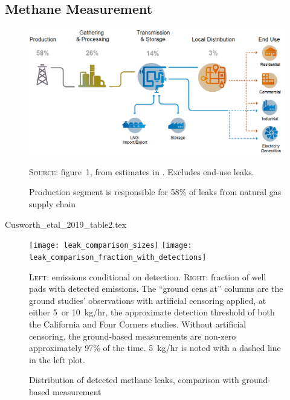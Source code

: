 \documentclass[12pt,oneside,letterpaper]{article}
\theoremstyle{definition}
\begin{document}
\begin{refsection}
\newpage
\section{Methane Measurement}
\label{app:methane-measurement}

\begin{figure}[!hbtp]
\caption{Production segment is responsible for 58\% of leaks from natural gas supply chain}
\vspace*{1\baselineskip}

\label{fig:EPA-leak-percentages-Marks}

\includegraphics[width=\textwidth]{natural_gas_leakage_percentages_marks_fig1}

\textsc{Source:} \textcite{Marks:2021} figure~1, from estimates in \textcite{Alvarez/etal:2018}.
Excludes end-use leaks.
\end{figure}

\begin{table}[!bth]
\centering
{Cusworth_etal_2019_table2.tex}
\end{table}



\begin{figure}[!bth]
\caption{Distribution of detected methane leaks, comparison with ground-based measurement}
\label{fig:app-leak-sizes}
\texttt{[image: leak\_comparison\_sizes]}
\texttt{[image: leak\_comparison\_fraction\_with\_detections]}

\textsc{Left:} emissions conditional on detection.
\textsc{Right:} fraction of well pads with detected emissions.
The ``ground cens at'' columns are the ground studies' observations with artificial censoring applied, at either 5~or 10~kg/hr, the approximate detection threshold of both the California and Four Corners studies.
Without artificial censoring, the ground-based measurements are non-zero approximately 97\% of the time.
5~kg/hr is noted with a dashed line in the left plot.


\end{figure}
\end{refsection}
\end{document}
